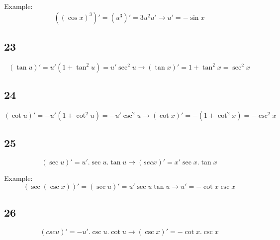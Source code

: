 Example:
\[ ((\cos x)^3)' = (u^3)' = 3u^2u' \to u' = -\sin x \]

\subsection{23}
\[ (\tan u)' = u'(1+\tan^2u) = u'\sec^2u \to (\tan x)' = 1+\tan^2 x = \sec^2 x \]

\subsection{24}
\[ (\cot u)' = -u'(1+\cot^2u) = -u'\csc^2u \to (\cot x)' = -(1+\cot^2x) = -\csc^2x \]

\subsection{25}
\[ (\sec u)' = u'.\sec u.\tan u \to (sec x)' = x'\sec x.\tan x \]

Example:
\[ (\sec(\csc x))' = (\sec u)' = u'\sec u\tan u \to u' = -\cot x \csc x \]


\subsection{26}
\[ (csc u)' = -u'.\csc u.\cot u \to (\csc x)' = -\cot x.\csc x \]



